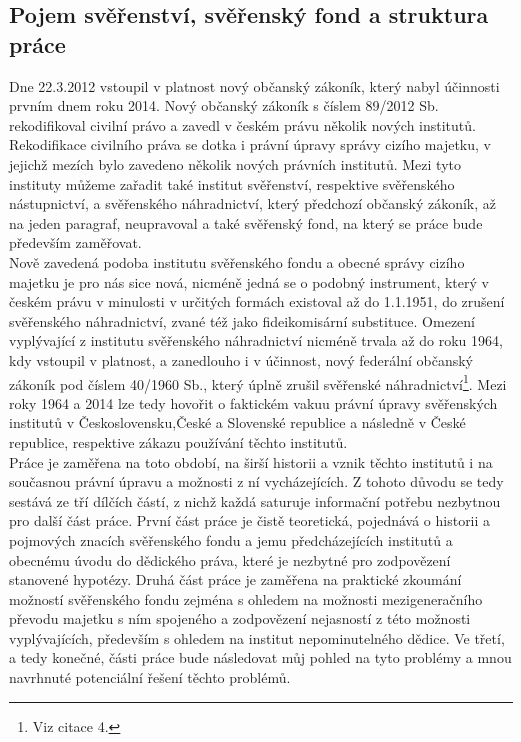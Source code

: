 \documentclass{article}
\begin{document}
\subsection{Pojem svěřenství, svěřenský fond a struktura práce}


\indent Dne 22.3.2012 vstoupil v platnost nový občanský zákoník, který nabyl účinnosti prvním dnem roku 2014. Nový občanský zákoník s číslem 89/2012 Sb. rekodifikoval civilní právo a zavedl v českém právu několik nových institutů. Rekodifikace civilního práva se dotka i právní úpravy správy cizího majetku, v jejichž mezích bylo zavedeno několik nových právních institutů. Mezi tyto instituty můžeme zařadit také institut svěřenství, respektive svěřenského nástupnictví, a svěřenského náhradnictví, který předchozí občanský zákoník, až na jeden paragraf, neupravoval a také svěřenský fond, na který se práce bude především zaměřovat. \\

\indent Nově zavedená podoba institutu svěřenského fondu a obecné správy cizího majetku je pro nás sice nová, nicméně jedná se o podobný instrument, který v českém právu v minulosti v určitých formách existoval až do 1.1.1951, do zrušení svěřens\-kého náhradnictví, zvané též jako fideikomisární substituce. Omezení vyplývající z institutu svěřenského náhradnictví nicméně trvala až do roku 1964, kdy vstoupil v platnost, a zanedlouho i v účinnost, nový federální občanský zákoník pod číslem 40/1960 Sb., který úplně zrušil svěřenské náhradnictví\footnote{Viz citace 4.}. Mezi roky 1964 a 2014 lze tedy hovořit o faktickém vakuu právní úpravy svěřen\-ských institutů v Československu,České a Slovenské republice a následně v České republice, respektive zákazu používání těchto institutů.\\

\indent Práce je zaměřena na toto období, na širší historii a vznik těchto institutů i na současnou právní úpravu a možnosti z ní vycházejících. Z tohoto důvodu se tedy sestává ze tří dílčích částí, z nichž každá saturuje informační potřebu nezbytnou pro další část práce. První část práce je čistě teoretická, pojednává o historii a pojmových znacích svěřenského fondu a jemu předcházejících institutů a obecnému úvodu do dědického práva, které je nezbytné pro zodpovězení stanovené hypotézy. Druhá část práce je zaměřena na praktické zkou\-mání možností svěřenského fondu zejména s ohledem na možnosti mezigeneračního převodu majetku s ním spojeného a zodpovězení nejasností z této možnosti vyplývajících, především s ohledem na institut nepominutelného dědice. Ve třetí, a tedy konečné, části práce bude následovat můj pohled na tyto problémy a mnou navrhnuté potenciální řešení těchto problémů. \\
\end{document}
